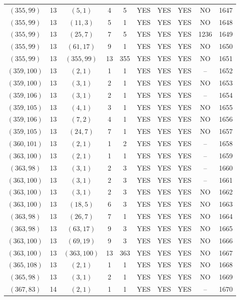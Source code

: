 \begin{longtable}{|c|c|c|c|c|c|c|c|c|c|}
$(355, 99)$ & 13 & $(5, 1)$ & 4 & 5 & YES & YES & YES & NO & 1647\\
$(355, 99)$ & 13 & $(11, 3)$ & 5 & 1 & YES & YES & YES & NO & 1648\\
$(355, 99)$ & 13 & $(25, 7)$ & 7 & 5 & YES & YES & YES & 1236 & 1649\\
$(355, 99)$ & 13 & $(61, 17)$ & 9 & 1 & YES & YES & YES & NO & 1650\\
$(355, 99)$ & 13 & $(355, 99)$ & 13 & 355 & YES & YES & YES & NO & 1651\\
$(359, 100)$ & 13 & $(2, 1)$ & 1 & 1 & YES & YES & YES & -- & 1652\\
$(359, 100)$ & 13 & $(3, 1)$ & 2 & 1 & YES & YES & YES & NO & 1653\\
$(359, 106)$ & 13 & $(3, 1)$ & 2 & 1 & YES & YES & YES & -- & 1654\\
$(359, 105)$ & 13 & $(4, 1)$ & 3 & 1 & YES & YES & YES & NO & 1655\\
$(359, 106)$ & 13 & $(7, 2)$ & 4 & 1 & YES & YES & YES & NO & 1656\\
$(359, 105)$ & 13 & $(24, 7)$ & 7 & 1 & YES & YES & YES & NO & 1657\\
$(360, 101)$ & 13 & $(2, 1)$ & 1 & 2 & YES & YES & YES & -- & 1658\\
$(363, 100)$ & 13 & $(2, 1)$ & 1 & 1 & YES & YES & YES & -- & 1659\\
$(363, 98)$ & 13 & $(3, 1)$ & 2 & 3 & YES & YES & YES & -- & 1660\\
$(363, 100)$ & 13 & $(3, 1)$ & 2 & 3 & YES & YES & YES & -- & 1661\\
$(363, 100)$ & 13 & $(3, 1)$ & 2 & 3 & YES & YES & YES & NO & 1662\\
$(363, 100)$ & 13 & $(18, 5)$ & 6 & 3 & YES & YES & YES & NO & 1663\\
$(363, 98)$ & 13 & $(26, 7)$ & 7 & 1 & YES & YES & YES & NO & 1664\\
$(363, 98)$ & 13 & $(63, 17)$ & 9 & 3 & YES & YES & YES & NO & 1665\\
$(363, 100)$ & 13 & $(69, 19)$ & 9 & 3 & YES & YES & YES & NO & 1666\\
$(363, 100)$ & 13 & $(363, 100)$ & 13 & 363 & YES & YES & YES & NO & 1667\\
$(365, 108)$ & 13 & $(2, 1)$ & 1 & 1 & YES & YES & YES & NO & 1668\\
$(365, 98)$ & 13 & $(3, 1)$ & 2 & 1 & YES & YES & YES & NO & 1669\\
$(367, 83)$ & 14 & $(2, 1)$ & 1 & 1 & YES & YES & YES & -- & 1670\\

\end{longtable}
